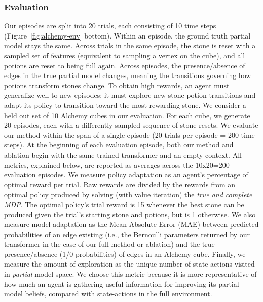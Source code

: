 \documentclass[sigconf]{aamas}
\begin{document}
\subsubsection{Evaluation} Our episodes are split into 20 trials, each consisting of 10 time steps (Figure~\ref{fig:alchemy-env} bottom). Within an episode, the ground truth partial model stays the same. Across trials in the same episode, the stone is reset with a sampled set of features (equivalent to sampling a vertex on the cube), and all potions are reset to being full again. Across episodes, the presence/absence of edges in the true partial model changes, meaning the transitions governing how potions transform stones change. To obtain high rewards, an agent must generalize well to new episodes: it must explore new stone-potion transitions and adapt its policy to transition toward the most rewarding stone.
We consider a held out set of 10 Alchemy cubes in our evaluation. For each cube, we generate 20 episodes, each with a differently sampled sequence of stone resets. We evaluate our method within the span of a single episode (20 trials per episode = 200 time steps). At the beginning of each evaluation episode, both our method and ablation begin with the same trained transformer and an empty context. All metrics, explained below, are reported as averages across the 10x20=200 evaluation episodes.
We measure policy adaptation as an agent's percentage of optimal reward per trial. Raw rewards are divided by the rewards from an optimal policy produced by solving (with value iteration) the \textit{true and complete MDP}. The optimal policy's trial reward is 15 whenever the best stone can be produced given the trial's starting stone and potions, but is 1 otherwise. We also measure model adaptation as the Mean Absolute Error (MAE) between predicted probabilities of an edge existing (i.e., the Bernoulli parameters returned by our transformer in the case of our full method or ablation) and the true presence/absence (1/0 probabilities) of edges in an Alchemy cube. Finally, we measure the amount of exploration as the unique number of state-actions visited in \textit{partial} model space. We choose this metric because it is more representative of how much an agent is gathering useful information for improving its partial model beliefs, compared with state-actions in the full environment.
\end{document}
